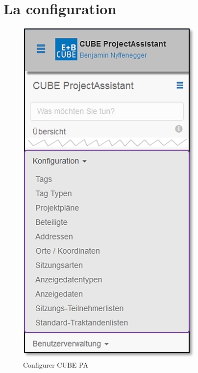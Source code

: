 
\clearpage
\section{La configuration}

\begin{figure}   %
  \vspace{-35pt}      %
  \begin{center}
    \includegraphics[width=1\linewidth]{../chapters/13_Konfigurationen/pictures/13_Menu_Konfiguration.jpg}
  \end{center}
  \vspace{-20pt}
  \caption{Configurer CUBE PA}
  \vspace{-10pt}
\end{figure}

